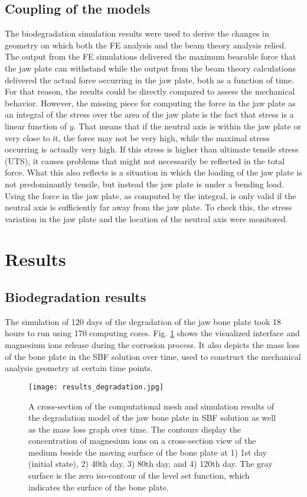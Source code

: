 \subsection{Coupling of the models}

The biodegradation simulation results were used to derive the changes in geometry on which both the FE analysis and the beam theory analysis relied. The output from the FE simulations delivered the maximum bearable force that the jaw plate can withstand while the output from the beam theory calculations delivered the actual force occurring in the jaw plate, both as a function of time. For that reason, the results could be directly compared to assess the mechanical behavior. However, the missing piece for computing the force in the jaw plate as an integral of the stress over the area of the jaw plate is the fact that stress is a linear function of $y$. That means that if the neutral axis is within the jaw plate or very close to it, the force may not be very high, while the maximal stress occurring is actually very high. If this stress is higher than ultimate tensile stress (UTS), it causes problems that might not necessarily be reflected in the total force. What this also reflects is a situation in which the loading of the jaw plate is not predominantly tensile, but instead the jaw plate is under a bending load. Using the force in the jaw plate, as computed by the integral, is only valid if the neutral axis is sufficiently far away from the jaw plate. To check this, the stress variation in the jaw plate and the location of the neutral axis were monitored.

\section{Results}
\label{sec:results}

\subsection{Biodegradation results}

The simulation of 120 days of the degradation of the jaw bone plate took 18 hours to run using 170 computing cores. Fig. \ref{fig:results_degradation} shows the visualized interface and magnesium ions release during the corrosion process. It also depicts the mass loss of the bone plate in the SBF solution over time, used to construct the mechanical analysis geometry at certain time points.

\begin{figure}[t]
\center \texttt{[image: results\_degradation.jpg]}
\caption{A cross-section of the computational mesh and simulation results of the degradation model of the jaw bone plate in SBF solution as well as the mass loss graph over time. The contours display the concentration of magnesium ions on a cross-section view of the medium beside the moving surface of the bone plate at 1) 1st day (initial state), 2) 40th day, 3) 80th day, and 4) 120th day. The gray surface is the zero iso-contour of the level set function, which indicates the surface of the bone plate.} \label{fig:results_degradation}
\end{figure}

